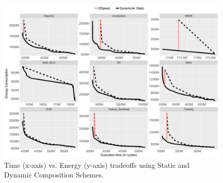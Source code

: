 \begin{figure}[t]
    \centering
	\includegraphics[width=1\textwidth]{cases-paper/graphics/pareto/pareto_best.pdf}
    \caption{Time (x-axis) vs. Energy (y-axis) tradeoffs using Static and Dynamic Composition Schemes.}
    \label{fig:paretos}
	\vspace{1em}
\end{figure}

%
%

